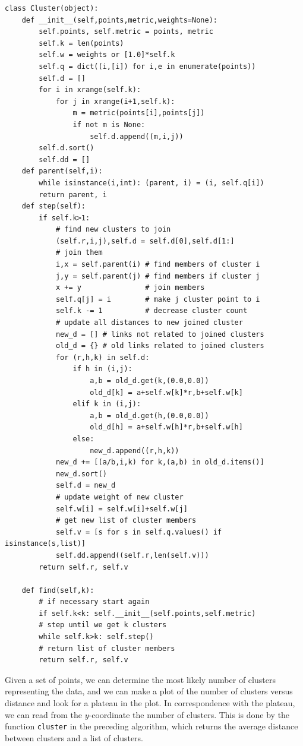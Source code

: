 \documentclass[justified,sixbynine]{tufte-book}
\def\ft{\small\tt}
\theoremstyle{plain}%
\theoremstyle{definition}
\theoremstyle{remark}
\begin{document}
\begin{fullwidth}
\begin{lstlisting}[caption={in file: {\ft nlib.py}}]
class Cluster(object):
    def __init__(self,points,metric,weights=None):
        self.points, self.metric = points, metric
        self.k = len(points)
        self.w = weights or [1.0]*self.k
        self.q = dict((i,[i]) for i,e in enumerate(points))
        self.d = []
        for i in xrange(self.k):
            for j in xrange(i+1,self.k):
                m = metric(points[i],points[j])
                if not m is None:
                    self.d.append((m,i,j))
        self.d.sort()
        self.dd = []
    def parent(self,i):
        while isinstance(i,int): (parent, i) = (i, self.q[i])
        return parent, i
    def step(self):
        if self.k>1:
            # find new clusters to join
            (self.r,i,j),self.d = self.d[0],self.d[1:]
            # join them
            i,x = self.parent(i) # find members of cluster i
            j,y = self.parent(j) # find members if cluster j
            x += y               # join members
            self.q[j] = i        # make j cluster point to i
            self.k -= 1          # decrease cluster count
            # update all distances to new joined cluster
            new_d = [] # links not related to joined clusters
            old_d = {} # old links related to joined clusters
            for (r,h,k) in self.d:
                if h in (i,j):
                    a,b = old_d.get(k,(0.0,0.0))
                    old_d[k] = a+self.w[k]*r,b+self.w[k]
                elif k in (i,j):
                    a,b = old_d.get(h,(0.0,0.0))
                    old_d[h] = a+self.w[h]*r,b+self.w[h]
                else:
                    new_d.append((r,h,k))
            new_d += [(a/b,i,k) for k,(a,b) in old_d.items()]
            new_d.sort()
            self.d = new_d
            # update weight of new cluster
            self.w[i] = self.w[i]+self.w[j]
            # get new list of cluster members
            self.v = [s for s in self.q.values() if isinstance(s,list)]
            self.dd.append((self.r,len(self.v)))
        return self.r, self.v

    def find(self,k):
        # if necessary start again
        if self.k<k: self.__init__(self.points,self.metric)
        # step until we get k clusters
        while self.k>k: self.step()
        # return list of cluster members
        return self.r, self.v
\end{lstlisting}

Given a set of points, we can determine the most likely number of clusters representing the data, and we can make a plot of the number of clusters versus distance and look for a plateau in the plot. In correspondence with the plateau, we can read from the $y$-coordinate the number of clusters. This is done by the function {\ft cluster} in the preceding algorithm, which returns the average distance between clusters and a list of clusters.


\end{fullwidth}
\end{document}
